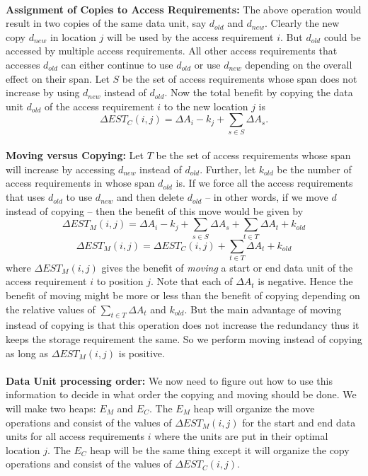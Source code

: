 \\
{\bf Assignment of Copies to Access Requirements:} The above operation would result in two copies of the same data unit, say $d_{old}$ and $d_{new}$. Clearly the new copy $d_{new}$ in location $j$ will be used by the access requirement $i$.  But $d_{old}$ could be accessed by
multiple access requirements. All other access requirements that accesses $d_{old}$ can either continue to use $d_{old}$ or use $d_{new}$ depending on the overall effect on their span. Let $S$ be the set of access requirements whose span does not increase by using $d_{new}$ instead of $d_{old}$. Now the total benefit by copying the data unit $d_{old}$ of the access requirement $i$ to the new location $j$ is
\begin{equation}
\Delta EST_C(i,j) = \Delta A_i - k_j + \sum_{s\in S}\Delta{A_s}.
\label{eq:copyingcost}
\end{equation}
\\
{\bf Moving versus Copying:} Let $T$ be the set of access requirements whose span will increase by accessing $d_{new}$ instead of $d_{old}$. Further, let $k_{old}$ be the number of access requirements in whose span $d_{old}$ is. If we force all the access requirements that uses $d_{old}$ to use $d_{new}$ and then delete $d_{old}$ -- in other words, if we move $d$ instead of copying -- then the benefit of this move would be given by
\[
 \Delta EST_M(i,j) = \Delta A_i - k_j + \sum_{s\in S}\Delta{A_s} + \sum_{t\in T}\Delta{A_t} + k_{old}
\]
\[
 \Delta EST_M(i,j) = \Delta EST_C(i,j) + \sum_{t\in T}\Delta{A_t} + k_{old}
\]
where $\Delta EST_M(i,j)$ gives the benefit of {\it moving} a start or end data unit of the access requirement $i$ to position $j$. Note that each of $\Delta A_t$ is negative. Hence the benefit of moving might be more or less than the benefit of copying depending on the relative values of $\sum_{t\in T}\Delta{A_t}$ and $k_{old}$. But the main advantage of moving instead of copying is that this operation does not increase the redundancy thus it keeps the storage requirement the same. So we perform moving instead of copying as long as $\Delta EST_M(i,j)$ is positive.\\
\\
{\bf Data Unit processing order:} We now need to figure out how to use this
information to decide in what order the copying and moving should be done. We will make two heaps: $E_M$ and $E_C$. The $E_M$ heap will organize the move operations and consist of the values of $\Delta EST_M(i,j)$ for the start and end data units for all access requirements $i$ where the units are put in their optimal location $j$. The $E_C$ heap will be the same thing except it will organize the copy operations and consist of the values of $\Delta EST_C(i,j)$.\\

